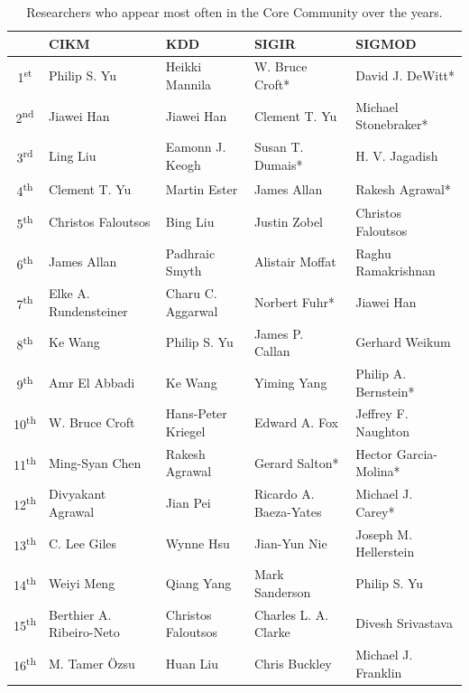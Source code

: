 \begin{table}[!htb]
\centering
\caption{Researchers who appear most often in the Core Community over the years.}
\label{tab:authors_frequency_core_community}
{\small
\begin{tabular}{|c|l|l|l|l|} \hline
 & \bf CIKM & \bf KDD &\bf  SIGIR & \bf SIGMOD\\ \hline
1\textsuperscript{st} & Philip S. Yu & Heikki Mannila & W. Bruce Croft* & David J. DeWitt*\\ \hline
2\textsuperscript{nd} & Jiawei Han & Jiawei Han & Clement T. Yu & Michael Stonebraker*\\ \hline
3\textsuperscript{rd} & Ling Liu & Eamonn J. Keogh & Susan T. Dumais* & H. V. Jagadish\\ \hline
4\textsuperscript{th} & Clement T. Yu & Martin Ester & James Allan & Rakesh Agrawal*\\ \hline
5\textsuperscript{th} & Christos Faloutsos & Bing Liu & Justin Zobel & Christos Faloutsos\\ \hline
6\textsuperscript{th} & James Allan & Padhraic Smyth & Alistair Moffat & Raghu Ramakrishnan\\ \hline
7\textsuperscript{th} & Elke A. Rundensteiner & Charu C. Aggarwal & Norbert Fuhr* & Jiawei Han\\ \hline
8\textsuperscript{th} & Ke Wang & Philip S. Yu & James P. Callan & Gerhard Weikum\\ \hline
9\textsuperscript{th} & Amr El Abbadi & Ke Wang & Yiming Yang & Philip A. Bernstein*\\ \hline
10\textsuperscript{th} & W. Bruce Croft & Hans-Peter Kriegel & Edward A. Fox & Jeffrey F. Naughton\\ \hline
11\textsuperscript{th} & Ming-Syan Chen & Rakesh Agrawal & Gerard Salton* & Hector Garcia-Molina*\\ \hline
12\textsuperscript{th} & Divyakant Agrawal & Jian Pei & Ricardo A. Baeza-Yates & Michael J. Carey*\\ \hline
13\textsuperscript{th} & C. Lee Giles & Wynne Hsu & Jian-Yun Nie & Joseph M. Hellerstein\\ \hline
14\textsuperscript{th} & Weiyi Meng & Qiang Yang & Mark Sanderson & Philip S. Yu\\ \hline
15\textsuperscript{th} & Berthier A. Ribeiro-Neto & Christos Faloutsos & Charles L. A. Clarke & Divesh Srivastava\\ \hline
16\textsuperscript{th} & M. Tamer \"Ozsu & Huan Liu & Chris Buckley & Michael J. Franklin\\ \hline

\end{tabular}}
\end{table}
